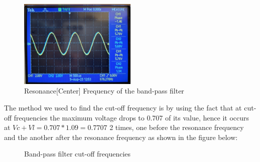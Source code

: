 \documentclass[12pt]{article}
\begin{document}
\begin{figure}[H]
    \centering
    \includegraphics[width=0.5\textwidth]{assets/f0p2.jpg}
    \caption{Resonance[Center] Frequency of the band-pass filter}
\end{figure}
The method we used to find the cut-off frequency is by using the fact that at cut-off frequencies the maximum voltage drops to 0.707 of its value, hence it occurs at $Vc + Vl = 0.707 * 1.09 = 0.7707$ 2 times, one before the resonance frequency and the another after the resonance frequency as shown in the figure below:
\begin{figure}[H]
    \centering
    \caption{Band-pass filter cut-off frequencies}
\end{figure}
\end{document}
